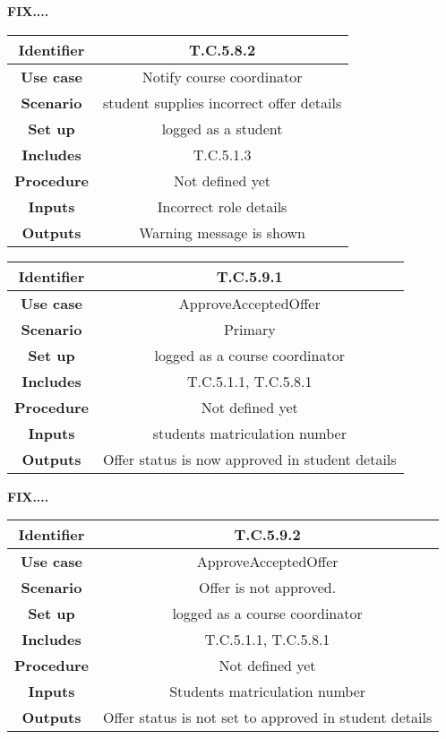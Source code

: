 \textbf{FIX....}
\begin{tabular}{|c|c|}
\hline \textbf{Identifier} & T.C.5.8.2\\
\hline \textbf{Use case} & Notify course coordinator\\
\hline \textbf{Scenario} & student supplies incorrect offer details\\
\hline \textbf{Set up} & logged as a student\\
\hline \textbf{Includes} & T.C.5.1.3\\
\hline \textbf{Procedure} & Not defined yet\\
\hline \textbf{Inputs} & Incorrect role details \\
\hline \textbf{Outputs} & Warning message is shown\\
\hline
\end{tabular}

\begin{tabular}{|c|c|}
\hline \textbf{Identifier} & T.C.5.9.1\\
\hline \textbf{Use case} & ApproveAcceptedOffer\\
\hline \textbf{Scenario} & Primary\\
\hline \textbf{Set up} & logged as a course coordinator\\
\hline \textbf{Includes} & T.C.5.1.1, T.C.5.8.1\\
\hline \textbf{Procedure} & Not defined yet\\
\hline \textbf{Inputs} & students matriculation number\\
\hline \textbf{Outputs} & Offer status is now approved in student details\\
\hline
\end{tabular}

\textbf{FIX....}
\begin{tabular}{|c|c|}
\hline \textbf{Identifier} & T.C.5.9.2\\
\hline \textbf{Use case} & ApproveAcceptedOffer\\
\hline \textbf{Scenario} & Offer is not approved.\\
\hline \textbf{Set up} & logged as a course coordinator\\
\hline \textbf{Includes} & T.C.5.1.1, T.C.5.8.1\\
\hline \textbf{Procedure} & Not defined yet\\
\hline \textbf{Inputs} & Students matriculation number\\
\hline \textbf{Outputs} & Offer status is not set to approved in student details\\
\hline
\end{tabular}

